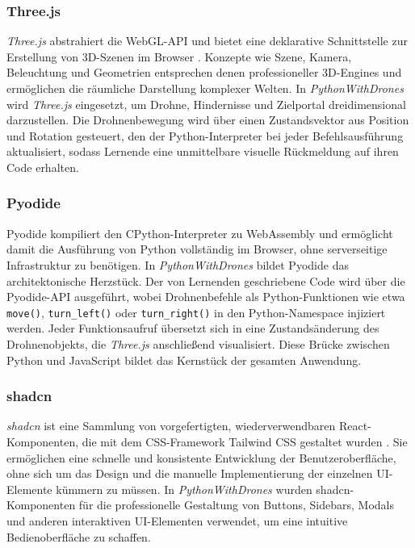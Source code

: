 \documentclass[a4paper,12pt]{article}
\begin{document}
	\subsubsection{Three.js}
	\textit{Three.js} abstrahiert die WebGL-API und bietet eine deklarative
	Schnittstelle zur Erstellung von 3D-Szenen im Browser \cite{threejs}. Konzepte wie
	Szene, Kamera, Beleuchtung und Geometrien entsprechen denen
	professioneller 3D-Engines und ermöglichen die räumliche Darstellung
	komplexer Welten. In \textit{PythonWithDrones} wird \textit{Three.js} eingesetzt,
	um Drohne, Hindernisse und Zielportal dreidimensional darzustellen. Die
	Drohnenbewegung wird über einen Zustandsvektor aus Position und Rotation
	gesteuert, den der Python-Interpreter bei jeder Befehlsausführung
	aktualisiert, sodass Lernende eine unmittelbare visuelle Rückmeldung
	auf ihren Code erhalten.
	
	\subsubsection{Pyodide}
	Pyodide kompiliert den CPython-Interpreter zu WebAssembly und
	ermöglicht damit die Ausführung von Python vollständig im Browser, ohne
	serverseitige Infrastruktur zu benötigen. In \textit{PythonWithDrones}
	bildet Pyodide das architektonische Herzstück. Der von Lernenden
	geschriebene Code wird über die Pyodide-API ausgeführt, wobei
	Drohnenbefehle als Python-Funktionen wie etwa \texttt{move()},
	\texttt{turn\_left()} oder \texttt{turn\_right()} in den Python-Namespace
	injiziert werden. Jeder Funktionsaufruf übersetzt sich in eine
	Zustandsänderung des Drohnenobjekts, die \textit{Three.js} anschließend
	visualisiert. Diese Brücke zwischen Python und JavaScript bildet das
	Kernstück der gesamten Anwendung.

	\subsubsection{shadcn}
	\textit{shadcn} ist eine Sammlung von vorgefertigten, wiederverwendbaren 
	React-Komponenten, die mit dem CSS-Framework Tailwind CSS gestaltet wurden \cite{shadcn}. Sie ermöglichen 
	eine schnelle und konsistente Entwicklung der Benutzeroberfläche, ohne sich um das Design 
	und die manuelle Implementierung der einzelnen UI-Elemente kümmern zu müssen.
	In \textit{PythonWithDrones} wurden shadcn-Komponenten für die professionelle Gestaltung 
	von Buttons, Sidebars, Modals und anderen interaktiven UI-Elementen verwendet, um eine
	intuitive Bedienoberfläche zu schaffen.
\end{document}
